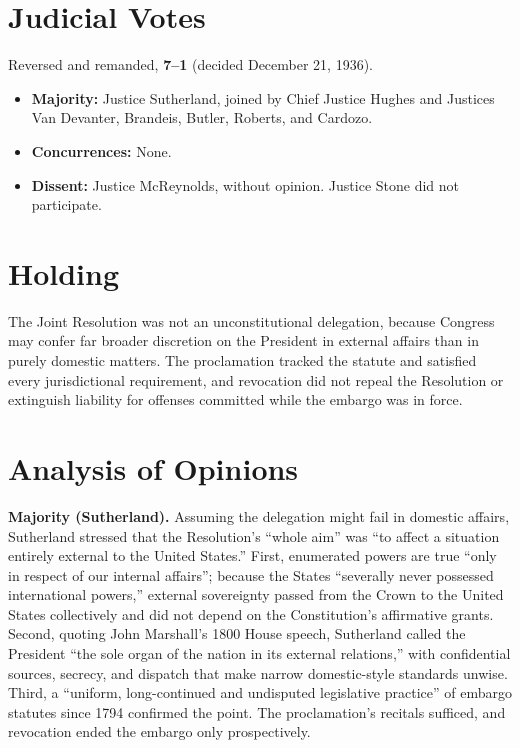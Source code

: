 \documentclass[12pt]{article}
\begin{document}
\section{Judicial Votes}

Reversed and remanded, \textbf{7--1} (decided December 21, 1936).
\begin{itemize}
\item \textbf{Majority:} Justice Sutherland, joined by Chief Justice Hughes and Justices Van Devanter, Brandeis, Butler, Roberts, and Cardozo.
\item \textbf{Concurrences:} None.
\item \textbf{Dissent:} Justice McReynolds, without opinion. Justice Stone did not participate.
\end{itemize}

\section{Holding}

The Joint Resolution was not an unconstitutional delegation, because Congress may confer far broader discretion on the President in external affairs than in purely domestic matters. The proclamation tracked the statute and satisfied every jurisdictional requirement, and revocation did not repeal the Resolution or extinguish liability for offenses committed while the embargo was in force.

\section{Analysis of Opinions}

\textbf{Majority (Sutherland).} Assuming the delegation might fail in domestic affairs, Sutherland stressed that the Resolution's ``whole aim'' was ``to affect a situation entirely external to the United States.'' First, enumerated powers are true ``only in respect of our internal affairs''; because the States ``severally never possessed international powers,'' external sovereignty passed from the Crown to the United States collectively and did not depend on the Constitution's affirmative grants. Second, quoting John Marshall's 1800 House speech, Sutherland called the President ``the sole organ of the nation in its external relations,'' with confidential sources, secrecy, and dispatch that make narrow domestic-style standards unwise. Third, a ``uniform, long-continued and undisputed legislative practice'' of embargo statutes since 1794 confirmed the point. The proclamation's recitals sufficed, and revocation ended the embargo only prospectively.
\end{document}
